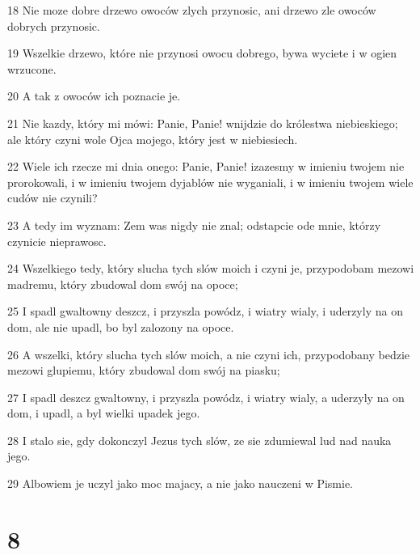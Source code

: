\par 18 Nie moze dobre drzewo owoców zlych przynosic, ani drzewo zle owoców dobrych przynosic.
\par 19 Wszelkie drzewo, które nie przynosi owocu dobrego, bywa wyciete i w ogien wrzucone.
\par 20 A tak z owoców ich poznacie je.
\par 21 Nie kazdy, który mi mówi: Panie, Panie! wnijdzie do królestwa niebieskiego; ale który czyni wole Ojca mojego, który jest w niebiesiech.
\par 22 Wiele ich rzecze mi dnia onego: Panie, Panie! izazesmy w imieniu twojem nie prorokowali, i w imieniu twojem dyjablów nie wyganiali, i w imieniu twojem wiele cudów nie czynili?
\par 23 A tedy im wyznam: Zem was nigdy nie znal; odstapcie ode mnie, którzy czynicie nieprawosc.
\par 24 Wszelkiego tedy, który slucha tych slów moich i czyni je, przypodobam mezowi madremu, który zbudowal dom swój na opoce;
\par 25 I spadl gwaltowny deszcz, i przyszla powódz, i wiatry wialy, i uderzyly na on dom, ale nie upadl, bo byl zalozony na opoce.
\par 26 A wszelki, który slucha tych slów moich, a nie czyni ich, przypodobany bedzie mezowi glupiemu, który zbudowal dom swój na piasku;
\par 27 I spadl deszcz gwaltowny, i przyszla powódz, i wiatry wialy, a uderzyly na on dom, i upadl, a byl wielki upadek jego.
\par 28 I stalo sie, gdy dokonczyl Jezus tych slów, ze sie zdumiewal lud nad nauka jego.
\par 29 Albowiem je uczyl jako moc majacy, a nie jako nauczeni w Pismie.

\chapter{8}

